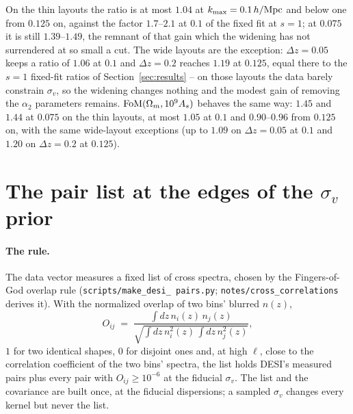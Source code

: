 \documentclass[11pt]{article}
\newcommand{\kmax}{k_{\rm max}}
\newcommand{\hMpc}{\,h/{\rm Mpc}}
\newcommand{\sv}{\sigma_v}
\newcommand{\us}{\_\allowbreak}
\begin{document}
On the thin layouts the ratio is at most $1.04$ at $\kmax = 0.1\hMpc$
and below one from $0.125$ on, against the factor $1.7$--$2.1$ at
$0.1$ of the fixed fit at $s = 1$; at $0.075$ it is still
$1.39$--$1.49$, the remnant of that gain which the widening has not
surrendered at so small a cut.  The wide layouts are the exception:
$\Delta z = 0.05$ keeps a ratio of $1.06$ at $0.1$ and $\Delta z =
0.2$ reaches $1.19$ at $0.125$, equal there to the $s = 1$ fixed-fit
ratios of Section~\ref{sec:results} -- on those layouts the data
barely constrain $\sv$, so the widening changes nothing and the
modest gain of removing the $\alpha_2$ parameters remains.
${\rm FoM}(\Omega_m, 10^9 A_s)$ behaves the same way: $1.45$ and
$1.44$ at $0.075$ on the thin layouts, at most $1.05$ at $0.1$ and
$0.90$--$0.96$ from $0.125$ on, with the same wide-layout exceptions
(up to $1.09$ on $\Delta z = 0.05$ at $0.1$ and $1.20$ on
$\Delta z = 0.2$ at $0.125$).

\section{The pair list at the edges of the $\sv$ prior}
\label{sec:pairs}

\paragraph{The rule.}
The data vector measures a fixed list of cross spectra, chosen by the
Fingers-of-God overlap rule (\texttt{scripts/make\us desi\us
pairs.py}; \texttt{notes/cross\us correlations} derives it).  With the
normalized overlap of two bins' blurred $n(z)$,
\begin{equation}
  O_{ij} \;=\; \frac{\int dz\, n_i(z)\, n_j(z)}
  {\sqrt{\int dz\, n_i^2(z)\,\int dz\, n_j^2(z)}} ,
  \label{eq:overlap}
\end{equation}
$1$ for two identical shapes, $0$ for disjoint ones and, at high
$\ell$, close to the correlation coefficient of the two bins' spectra,
the list holds DESI's measured pairs plus every pair with
$O_{ij} \ge 10^{-6}$ at the fiducial $\sv$.  The list and the
covariance are built once, at the fiducial dispersions; a sampled
$\sv$ changes every kernel but never the list.
\end{document}
